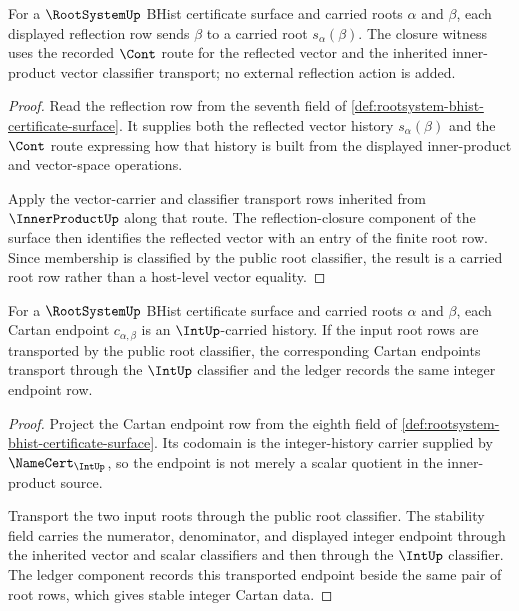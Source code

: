 \begin{theorem}
\label{thm:rootsystem-reflection-closure-obligation}
For a $\RootSystemUp$ BHist certificate surface and carried roots
$\alpha$ and $\beta$, each displayed reflection row sends $\beta$ to a
carried root $s_\alpha(\beta)$. The closure witness uses the recorded
$\Cont$ route for the reflected vector and the inherited inner-product vector
classifier transport; no external reflection action is added.
\end{theorem}
\begin{proof}
Read the reflection row from the seventh field of
\autoref{def:rootsystem-bhist-certificate-surface}. It supplies both the
reflected vector history $s_\alpha(\beta)$ and the $\Cont$ route expressing
how that history is built from the displayed inner-product and vector-space
operations.

Apply the vector-carrier and classifier transport rows inherited from
$\InnerProductUp$ along that route. The reflection-closure component of the
surface then identifies the reflected vector with an entry of the finite root
row. Since membership is classified by the public root classifier, the result
is a carried root row rather than a host-level vector equality.
\end{proof}

\begin{theorem}
\label{thm:rootsystem-cartan-ledger-obligation}
For a $\RootSystemUp$ BHist certificate surface and carried roots
$\alpha$ and $\beta$, each Cartan endpoint $c_{\alpha,\beta}$ is an
$\IntUp$-carried history. If the input root rows are transported by the
public root classifier, the corresponding Cartan endpoints transport through
the $\IntUp$ classifier and the ledger records the same integer endpoint row.
\end{theorem}
\begin{proof}
Project the Cartan endpoint row from the eighth field of
\autoref{def:rootsystem-bhist-certificate-surface}. Its codomain is the
integer-history carrier supplied by $\NameCert_{\IntUp}$, so the endpoint is
not merely a scalar quotient in the inner-product source.

Transport the two input roots through the public root classifier. The
stability field carries the numerator, denominator, and displayed integer
endpoint through the inherited vector and scalar classifiers and then through
the $\IntUp$ classifier. The ledger component records this transported
endpoint beside the same pair of root rows, which gives stable integer Cartan
data.
\end{proof}

